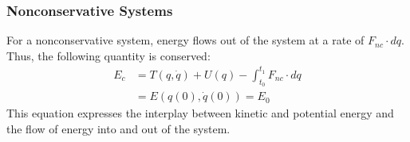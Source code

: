 \documentclass{beamer}
\newcommand{\nc}{\mathit{nc}}
\begin{document}
\begin{frame}
\end{frame}


\begin{frame}
  \frametitle{Nonconservative Systems}
  For a nonconservative system, energy flows out of the system at a rate of $F_{\nc} \cdot dq$. Thus, the following quantity is conserved:
  \begin{align*}
    E_{c} &= T(q, \dot q) + U(q) - \int_{t_{0}}^{t_{1}} \! F_{\nc} \cdot dq\\
    &= E(q(0), \dot q(0)) = E_{0}
  \end{align*}
  This equation expresses the interplay between kinetic and potential energy and the flow of energy into and out of the system.
\end{frame}
\end{document}
